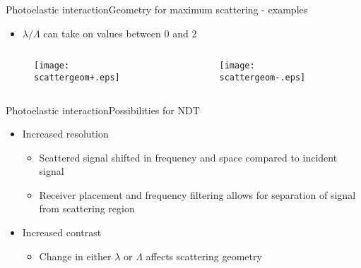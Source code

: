 \documentclass[11pt]{beamer}
\begin{document}
	\begin{frame}{Photoelastic interaction}{Geometry for maximum scattering - examples}
		\begin{itemize}
			\item $\lambda/\Lambda$ can take on values between 0 and 2
		\end{itemize}
		\begin{columns}
			\begin{column}{0.5\textwidth}
				\begin{figure}
					\centering
					\texttt{[image: scattergeom+.eps]}
				\end{figure}
			\end{column}
			\begin{column}{0.5\textwidth}
				\begin{figure}
					\centering
					\texttt{[image: scattergeom-.eps]}
				\end{figure}
			\end{column}
		\end{columns}
	\end{frame}
	
	\begin{frame}{Photoelastic interaction}{Possibilities for NDT}
		\pause
		\begin{itemize}
			\item Increased resolution
			\begin{itemize}
				\item Scattered signal shifted in frequency and space compared to incident signal
				\item Receiver placement and frequency filtering allows for separation of signal from scattering region
			\end{itemize} \pause
			\item Increased contrast
			\begin{itemize}
				\item Change in either $\lambda$ or $\Lambda$ affects scattering geometry
			\end{itemize}
		\end{itemize}
	\end{frame}
	
\end{document}
